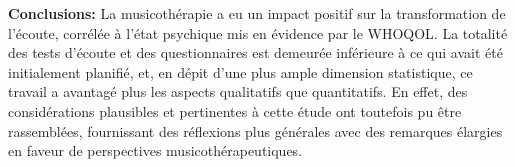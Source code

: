   
   \textbf{Conclusions:} La musicothérapie a eu un impact positif sur la transformation de l'écoute, 
  corrélée 
  à l'état psychique mis en évidence par le WHOQOL.
 La totalité des tests d'écoute et des questionnaires est demeurée  
inférieure à ce qui avait été initialement planifié, et, en dépit d'une plus ample dimension statistique, ce 
travail a avantagé plus les aspects qualitatifs que quantitatifs. 
En effet, des considérations plausibles et pertinentes à cette étude ont toutefois pu être rassemblées, 
fournissant des réflexions plus générales avec des remarques élargies en faveur de perspectives 
musicothérapeutiques.%
%

	







